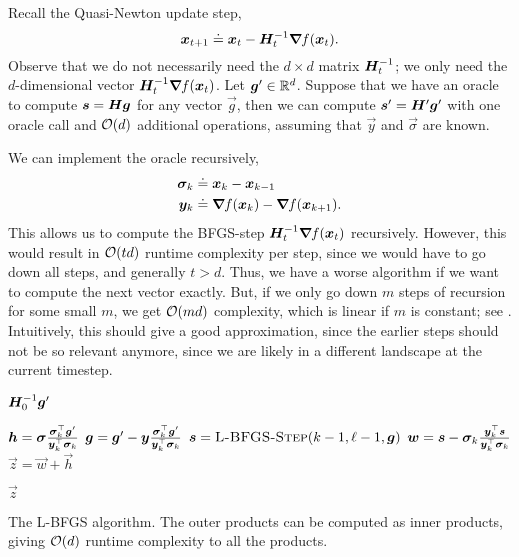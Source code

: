 Recall the Quasi-Newton update step, \[
    \bm{x}_{t+1} \doteq \bm{x}_t - \bm{H}^{-1}_t \bm{\nabla}_{\! } f(\bm{x}_t).
\]
Observe that we do not necessarily need the $d \times d$ matrix $\bm{H}^{-1}_t$; we only need the
$d$-dimensional vector $\bm{H}^{-1}_t \bm{\nabla}_{\! } f(\bm{x}_t)$. Let $\bm{g}' \in \mathbb{R}^d$. Suppose
that we have an oracle to compute $\bm{s} = \bm{H} \bm{g}$ for any vector $\vec{g}$, then we can
compute $\bm{s}' = \bm{H}' \bm{g}'$ with one oracle call and $\bigo{d}$ additional operations,
assuming that $\vec{y}$ and $\vec{\sigma}$ are known.

We can implement the oracle recursively,
\begin{align*}
    \bm{\sigma}_k & \doteq \bm{x}_k - \bm{x}_{k-1}                          \\
    \bm{y}_k      & \doteq \bm{\nabla}_{\! } f(\bm{x}_k) - \bm{\nabla}_{\! } f(\bm{x}_{k+1}).
\end{align*}
This allows us to compute the BFGS-step $\bm{H}^{-1}_t \bm{\nabla}_{\! } f(\bm{x}_t)$ recursively. However,
this would result in $\bigo{td}$ runtime complexity per step, since we would have to go down all
steps, and generally $t > d$. Thus, we have a worse algorithm if we want to compute the next vector
exactly. But, if we only go down $m$ steps of recursion for some small $m$, we get $\bigo{md}$
complexity, which is linear if $m$ is constant; see . Intuitively, this should give
a good approximation, since the earlier steps should not be so relevant anymore, since we are likely
in a different landscape at the current timestep.

\begin{algorithm}
    \begin{algorithmic}
        \State \Return $\bm{H}^{-1}_0 \bm{g}'$
        \EndIf

        \State $\bm{h} = \bm{\sigma} \frac{\bm{\sigma}_k^\top \bm{g}'}{\bm{y}_k^\top \bm{\sigma}_k}$
        \State $\bm{g} = \bm{g}' - \bm{y} \frac{\bm{\sigma}_k^\top \bm{g}'}{\bm{y}_k^\top \bm{\sigma}_k}$
        \State $\vec{s} = \Call{L-BFGS-Step}{k-1, \ell - 1, \vec{g}}$
        \State $\bm{w} = \bm{s} - \bm{\sigma}_k \frac{\bm{y}_k^\top \bm{s}}{\bm{y}_k^\top \bm{\sigma}_k}$
        \State $\vec{z} = \vec{w} + \vec{h}$

        \State \Return $\vec{z}$
        \EndFunction
    \end{algorithmic}
    \caption{The L-BFGS algorithm. The outer products can be computed as inner products, giving $\bigo{d}$ runtime complexity to all the products.}
    \label{alg:l-bfgs}
\end{algorithm}

